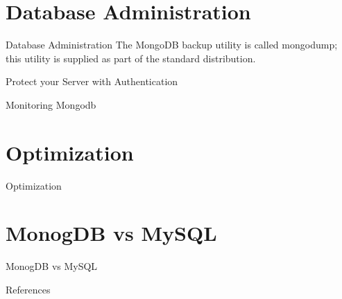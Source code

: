 \documentclass{beamer}
\begin{document}
\section{Database Administration}
\begin{frame}{Database Administration}
The MongoDB backup utility is called mongodump; this utility is supplied as part of the standard distribution.
\end{frame}

\begin{frame}{Protect your Server with  Authentication}
    
\end{frame}

\begin{frame}{Monitoring Mongodb}

\end{frame}

\section{Optimization}
\begin{frame}{Optimization}
	
\end{frame}

\section{MonogDB vs MySQL}
\begin{frame}{MonogDB vs MySQL}
    
\end{frame}

\begin{frame}{References}
	\small
    
    
\end{frame}
\end{document}

